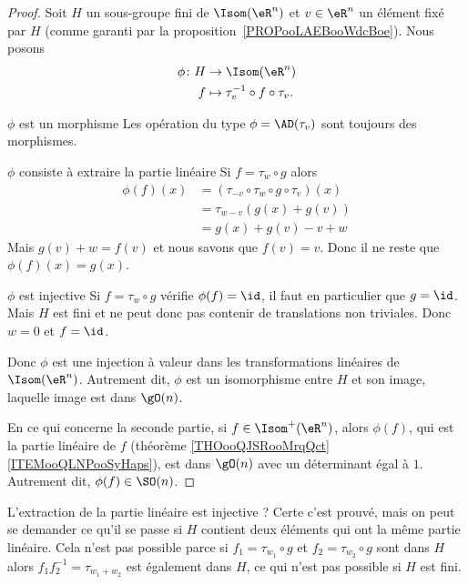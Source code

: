 \begin{proof}
	Soit \( H\) un sous-groupe fini de \( \Isom(\eR^n)\) et \( v\in \eR^n\) un élément fixé par \( H\) (comme garanti par la proposition~\ref{PROPooLAEBooWdcBoe}). Nous posons
	\begin{equation}
		\begin{aligned}
			\phi\colon H & \to \Isom(\eR^n)                           \\
			f            & \mapsto \tau_v^{-1}\circ f\circ \tau_v.
		\end{aligned}
	\end{equation}

	\begin{subproof}
		\item[\( \phi\) est un morphisme]
		Les opération du type \( \phi=\AD(\tau_v)\) sont toujours des morphismes.
		\item[\( \phi\) consiste à extraire la partie linéaire]
		Si \( f=\tau_w\circ g\) alors
		\begin{subequations}
			\begin{align}
				\phi(f)(x) & =(\tau_{-v}\circ\tau_w\circ g\circ\tau_v)(x) \\
				           & =\tau_{w-v}(   g(x)+g(v)  )                  \\
				           & =g(x)+g(v)-v+w
			\end{align}
		\end{subequations}
		Mais \( g(v)+w=f(v)\) et nous savons que \( f(v)=v\). Donc il ne reste que \( \phi(f)(x)=g(x)\).
		\item[\( \phi\) est injective]
		Si \( f=\tau_w\circ g\) vérifie \( \phi(f)=\id\), il faut en particulier que \( g=\id\). Mais \( H\) est fini et ne peut donc pas contenir de translations non triviales. Donc \( w=0\) et \( f=\id\).
	\end{subproof}
	Donc \( \phi\) est une injection à valeur dans les transformations linéaires de \( \Isom(\eR^n)\). Autrement dit, \( \phi\) est un isomorphisme entre \( H\) et son image, laquelle image est dans \( \gO(n)\).

    En ce qui concerne la seconde partie, si \( f\in\Isom^+(\eR^n)\), alors \( \phi(f)\), qui est la partie linéaire de \( f\) (théorème \ref{THOooQJSRooMrqQct}\ref{ITEMooQLNPooSyHaps}), est dans \( \gO(n)\) avec un déterminant égal à \( 1\). Autrement dit, \( \phi(f)\in\SO(n)\).
\end{proof}

L'extraction de la partie linéaire est injective ? Certe c'est prouvé, mais on peut se demander ce qu'il se passe si \( H\) contient deux éléments qui ont la même partie linéaire. Cela n'est pas possible parce si \( f_1=\tau_{w_1}\circ g\) et \( f_2=\tau_{w_2}\circ g\) sont dans \( H\) alors \( f_1f_2^{-1}=\tau_{w_1+w_2}\) est également dans \( H\), ce qui n'est pas possible si \( H\) est fini.

